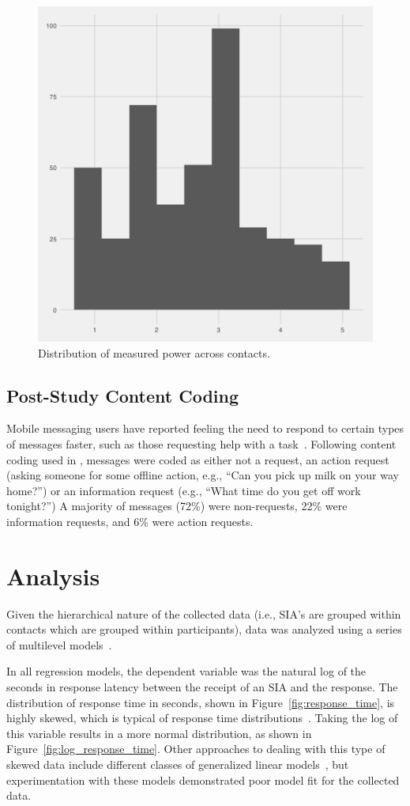 \documentclass[12pt]{nuthesis}	%
\begin{document}
\begin{figure}[h]
\centering
\includegraphics[width=.7\textwidth]{figures/power_distribution}
\caption{Distribution of measured power across contacts.}
\label{fig:power}
\end{figure}

\subsection{Post-Study Content Coding}

Mobile messaging users have reported feeling the need to respond to certain types of messages faster, such as those requesting help with a task~\citep{cui2016beyond}. Following content coding used in \citet{dabbish2005understanding}, messages were coded as either not a request, an action request (asking someone for some offline action, e.g., ``Can you pick up milk on your way home?'') or an information request (e.g., ``What time do you get off work tonight?'') A majority of messages (72\%) were non-requests, 22\% were information requests, and 6\% were action requests.

\section{Analysis}

Given the hierarchical nature of the collected data (i.e., SIA's are grouped within contacts which are grouped within participants), data was analyzed using a series of multilevel models~\citep{gelman2007data}.

In all regression models, the dependent variable was the natural log of the seconds in response latency between the receipt of an SIA and the response. The distribution of response time in seconds, shown in Figure~\ref{fig:response_time}, is highly skewed, which is typical of response time distributions~\citep{kalman2006pauses}. Taking the log of this variable results in a more normal distribution, as shown in Figure~\ref{fig:log_response_time}. Other approaches to dealing with this type of skewed data include different classes of generalized linear models~\citep[see e.g.,][]{buntin2004too,dick2004beyond,manning2001estimating}, but experimentation with these models demonstrated poor model fit for the collected data.
\end{document}
